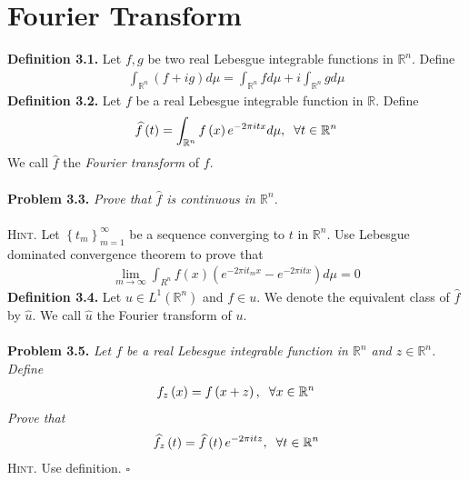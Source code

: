 \documentclass[a4paper]{article}
\numberwithin{equation}{section}
\begin{document}
\section{Fourier Transform}
\textbf{Definition 3.1.} Let $f,g$ be two real Lebesgue integrable functions in $\mathbb{R}^n$. Define
\begin{align}
\int_{{\mathbb{R}^n}} {\left( {f + ig} \right)d\mu }  = \int_{{\mathbb{R}^n}} {fd\mu }  + i\int_{{\mathbb{R}^n}} {gd\mu } 
\end{align}
\textbf{Definition 3.2.} Let $f$ be a real Lebesgue integrable function in $\mathbb{R}$. Define
\begin{align}
\widehat f\left( t \right) = \int_{{\mathbb{R}^n}} {f\left( x \right){e^{ - 2\pi itx}}d\mu } ,\hspace{0.2cm}\forall t \in {\mathbb{R}^n}
\end{align}
We call $\widehat f$ the \textit{Fourier transform} of $f$.\\
\\
\textbf{Problem 3.3.} \textit{Prove that $\widehat{f}$ is continuous in $\mathbb{R}^n$.}\\
\\
\textsc{Hint.} Let $\left\{ {{t_m}} \right\}_{m = 1}^\infty $ be a sequence converging to $t$ in $\mathbb{R}^n$. Use Lebesgue dominated convergence theorem to prove that
\begin{align}
\mathop {\lim }\limits_{m \to \infty } \int_{{R^n}} {f\left( x \right)\left( {{e^{ - 2\pi i{t_m}x}} - {e^{ - 2\pi itx}}} \right)d\mu }  = 0
\end{align}
\textbf{Definition 3.4.} Let $u\in L^1\left(\mathbb{R}^n\right)$ and $f\in u$. We denote the equivalent class of $\widehat f$ by $\widehat u$. We call $\widehat u$ the Fourier transform of $u$.\\
\\
\textbf{Problem 3.5.} \textit{Let $f$ be a real Lebesgue integrable function in $\mathbb{R}^n$ and $z\in \mathbb{R}^n$. Define}
\begin{align}
{f_z}\left( x \right) = f\left( {x + z} \right),\hspace{0.2cm}\forall x \in {\mathbb{R}^n}
\end{align}
\textit{Prove that}
\begin{align}
{\widehat f_z}\left( t \right) = \widehat f\left( t \right){e^{ - 2\pi itz}},\hspace{0.2cm}\forall t \in {\mathbb{R}^n}
\end{align}
\textsc{Hint.} Use definition. \hfill $\square$\\
\end{document}

